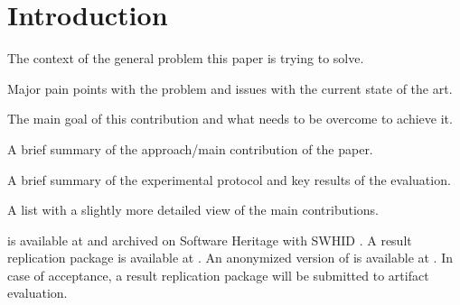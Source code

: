 \section{Introduction}
\label{sec:introduction}

 The context of the general problem this paper is trying to solve.

 Major pain points with the problem and issues with the current state of the
art.

 The main goal of this contribution and what needs to be overcome
to achieve it.

 A brief summary of the approach/main contribution of the paper.

 A brief summary of the experimental protocol and key results of the
evaluation.

 A list with a slightly more detailed view of the main contributions.

\ifcameraready
    \mytool is available at \MyToolRepoURL and archived on Software Heritage with SWHID
    \href{https://archive.softwareheritage.org/\MyToolSWHID}{\MyToolSWHID}. A result replication
    package is available at \ReplicationPackageURL.
\else
    An anonymized version of \mytool is available at \MyToolAnonymousRepoURL. In case of
    acceptance, a result replication package will be submitted to artifact evaluation.
\fi

